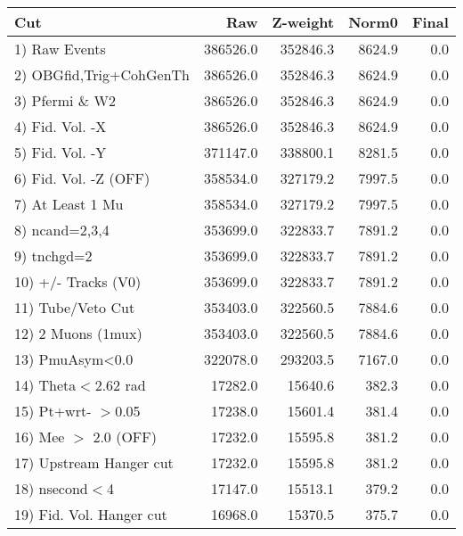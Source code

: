  \begin{table}[h!]\centering
 \begin{tabular}{||l||r|r|r|r||}
 \hline
 \hline
 Cut & Raw & Z-weight & Norm0 & Final \\
 \hline
  1) Raw Events           &    386526.0 &    352846.3 &      8624.9 &         0.0 \\
  2) OBGfid,Trig+CohGenTh &    386526.0 &    352846.3 &      8624.9 &         0.0 \\
  3) Pfermi \& W2         &    386526.0 &    352846.3 &      8624.9 &         0.0 \\
  4) Fid. Vol. -X         &    386526.0 &    352846.3 &      8624.9 &         0.0 \\
  5) Fid. Vol. -Y         &    371147.0 &    338800.1 &      8281.5 &         0.0 \\
  6) Fid. Vol. -Z (OFF)   &    358534.0 &    327179.2 &      7997.5 &         0.0 \\
  7) At Least 1 Mu        &    358534.0 &    327179.2 &      7997.5 &         0.0 \\
  8) ncand=2,3,4          &    353699.0 &    322833.7 &      7891.2 &         0.0 \\
  9) tnchgd=2             &    353699.0 &    322833.7 &      7891.2 &         0.0 \\
 10) +/- Tracks (V0)      &    353699.0 &    322833.7 &      7891.2 &         0.0 \\
 11) Tube/Veto Cut        &    353403.0 &    322560.5 &      7884.6 &         0.0 \\
 12) 2 Muons (1mux)       &    353403.0 &    322560.5 &      7884.6 &         0.0 \\
 13) PmuAsym<0.0          &    322078.0 &    293203.5 &      7167.0 &         0.0 \\
 14) Theta$<$2.62 rad     &     17282.0 &     15640.6 &       382.3 &         0.0 \\
 15) Pt+wrt- $>$0.05      &     17238.0 &     15601.4 &       381.4 &         0.0 \\
 16) Mee $>$ 2.0  (OFF)   &     17232.0 &     15595.8 &       381.2 &         0.0 \\
 17) Upstream Hanger cut  &     17232.0 &     15595.8 &       381.2 &         0.0 \\
 18) nsecond$<$4          &     17147.0 &     15513.1 &       379.2 &         0.0 \\
 19) Fid. Vol. Hanger cut &     16968.0 &     15370.5 &       375.7 &         0.0 \\

\end{tabular}
\end{table}

